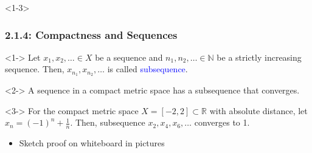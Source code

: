\documentclass[10pt,english,aspectratio=169]{beamer}
\begin{document}
\begin{frame}<1-3>
\frametitle{2.1.4: Compactness and Sequences}

\begin{definition}<1->
Let $x_1,x_2,\ldots \in X$ be a sequence and $n_1,n_2,\ldots\in \mathbb{N}$ be
a strictly increasing sequence.
Then, $x_{n_1},x_{n_2},\ldots$ is called \textcolor{blue}{subsequence}.
\end{definition}

\begin{theorem}<2->
A sequence in a compact metric space has a subsequence that converges.
\end{theorem}

\begin{example}<3->
For the compact metric space $X=[-2,2]\subset \mathbb{R}$ with absolute distance, let $x_n = (-1)^n + \frac{1}{n}$.
Then, subsequence $x_2,x_4,x_6,\ldots$ converges to 1.
\end{example}

\begin{itemize}
\item<3-> Sketch proof on whiteboard in pictures
\end{itemize}


\end{frame}
\end{document}
